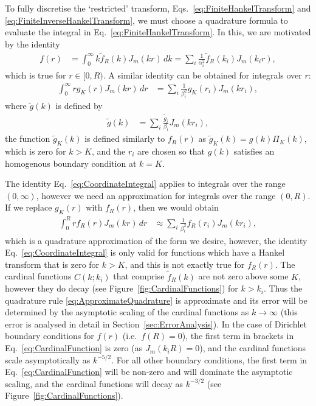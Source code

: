 \documentclass[aip,amsmath,amssymb,reprint,twocolumn]{revtex4-1}
\begin{document}
To fully discretise the `restricted' transform, Eqs.~\eqref{eq:FiniteHankelTransform} and \eqref{eq:FiniteInverseHankelTransform}, we must choose a quadrature formula to evaluate the integral in Eq.~\eqref{eq:FiniteHankelTransform}.  In this, we are motivated by the identity
\begin{align}
  f(r) &= \int_0^\infty k \tilde{f}_R(k) J_m(k r)\, dk = \sum_i \frac{1}{\alpha_i^2} \tilde{f}_R(k_i)J_m(k_i r),
\end{align}
which is true for $r \in [0, R)$.  A similar identity can be obtained for integrals over $r$:
\begin{align}
  \int_0^\infty r g_K(r) J_m(k r)\, dr &= \sum_i \frac{1}{\beta_i^2} g_K(r_i) J_m(k r_i), \label{eq:CoordinateIntegral}
\end{align}
where $\tilde{g}(k)$ is defined by
\begin{align}
  \tilde{g}(k) &= \sum_i \frac{\tilde{g}_i}{\beta_i} J_m(k r_i), \label{eq:DiniSeriesInK}
\end{align}
the function $\tilde{g}_K(k)$ is defined similarly to $f_R(r)$ as $\tilde{g}_K(k) = g(k) \Pi_K(k)$, which is zero for $k > K$, and the $r_i$ are chosen so that $g(k)$ satisfies an homogenous boundary condition at $k=K$.  

The identity Eq.~\eqref{eq:CoordinateIntegral} applies to integrals over the range $(0, \infty)$, however we need an approximation for integrals over the range $(0, R)$.  If we replace $g_K(r)$ with $f_R(r)$, then we would obtain
\begin{align}
  \int_0^R r f_R(r) J_m(k r)\, dr &\approx \sum_i \frac{1}{\beta_i^2} f_R(r_i) J_m(k r_i),  \label{eq:ApproximateQuadrature}
\end{align}
which is a quadrature approximation of the form we desire, however, the identity Eq.~\eqref{eq:CoordinateIntegral} is only valid for functions which have a Hankel transform that is zero for $k > K$, and this is not exactly true for $f_R(r)$.  The cardinal functions $C(k; k_i)$ that comprise $\tilde{f}_R(k)$ are not zero above some $K$, however they do decay (see Figure~\ref{fig:CardinalFunctions}) for $k > k_i$.  Thus the quadrature rule \eqref{eq:ApproximateQuadrature} is approximate and its error will be determined by the asymptotic scaling of the cardinal functions as $k\rightarrow\infty$ (this error is analysed in detail in Section~\ref{sec:ErrorAnalysis}).  In the case of Dirichlet boundary conditions for $f(r)$ (i.e.\ $f(R) = 0$), the first term in brackets in Eq.~\eqref{eq:CardinalFunction} is zero (as $J_m(k_i R) = 0$), and the cardinal functions scale asymptotically as $k^{-5/2}$.  For all other boundary conditions, the first term in Eq.~\eqref{eq:CardinalFunction} will be non-zero and will dominate the asymptotic scaling, and the cardinal functions will decay as $k^{-3/2}$ (see Figure~\ref{fig:CardinalFunctions}).  
\end{document}
